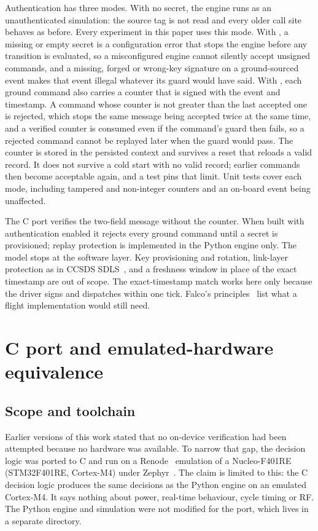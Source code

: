 \documentclass[preprint,12pt]{elsarticle}
\begin{document}
Authentication has three modes. With no secret, the engine runs as an unauthenticated simulation: the source tag is not read and every older call site behaves as before. Every experiment in this paper uses this mode. With , a missing or empty secret is a configuration error that stops the engine before any transition is evaluated, so a misconfigured engine cannot silently accept unsigned commands, and a missing, forged or wrong-key signature on a ground-sourced event makes that event illegal whatever its guard would have said. With , each ground command also carries a counter that is signed with the event and timestamp. A command whose counter is not greater than the last accepted one is rejected, which stops the same message being accepted twice at the same time, and a verified counter is consumed even if the command's guard then fails, so a rejected command cannot be replayed later when the guard would pass. The counter is stored in the persisted context and survives a reset that reloads a valid record. It does not survive a cold start with no valid record; earlier commands then become acceptable again, and a test pins that limit. Unit tests cover each mode, including tampered and non-integer counters and an on-board event being unaffected.

The C port verifies the two-field message without the counter. When built with authentication enabled it rejects every ground command until a secret is provisioned; replay protection is implemented in the Python engine only. The model stops at the software layer. Key provisioning and rotation, link-layer protection as in CCSDS SDLS~\cite{CCSDS2022SDLS}, and a freshness window in place of the exact timestamp are out of scope. The exact-timestamp match works here only because the driver signs and dispatches within one tick. Falco's principles~\cite{Falco2019SpaceCyber} list what a flight implementation would still need.

\section{C port and emulated-hardware equivalence}\label{sec:cport}

\subsection{Scope and toolchain}

Earlier versions of this work stated that no on-device verification had been attempted because no hardware was available. To narrow that gap, the decision logic was ported to C and run on a Renode~\cite{Renode} emulation of a Nucleo-F401RE (STM32F401RE, Cortex-M4) under Zephyr~\cite{Zephyr}. The claim is limited to this: the C decision logic produces the same decisions as the Python engine on an emulated Cortex-M4. It says nothing about power, real-time behaviour, cycle timing or RF. The Python engine and simulation were not modified for the port, which lives in a separate directory.
\end{document}

